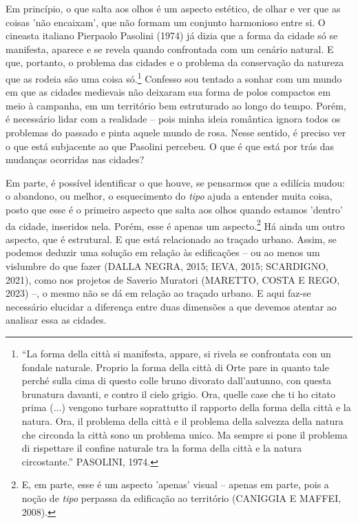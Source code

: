\documentclass[]{report}
\begin{document}
	Em princípio, o que salta aos olhos é um aspecto estético, de olhar e ver que as coisas 'não encaixam', que não formam um conjunto harmonioso entre si. O cineasta italiano Pierpaolo Pasolini (1974) já dizia que a forma da cidade só se manifesta, aparece e se revela quando confrontada com um cenário natural. E que, portanto, o problema das cidades e o problema da conservação da natureza que as rodeia são uma coisa só.\footnote[4]{“La forma della città si manifesta, appare, si rivela se confrontata con un fondale naturale. Proprio la forma della città di Orte pare in quanto tale perché sulla cima di questo colle bruno divorato dall’autunno, con questa brunatura davanti, e contro il cielo grigio. Ora, quelle case che ti ho citato prima (...) vengono turbare soprattutto il rapporto della forma della città e la natura. Ora, il problema della città e il problema della salvezza della natura che circonda la città sono un problema unico. Ma sempre si pone il problema di rispettare il confine naturale tra la forma della città e la natura circostante.” PASOLINI, 1974.} Confesso sou tentado a sonhar com um mundo em que as cidades medievais não deixaram sua forma de polos compactos em meio à campanha, em um território bem estruturado ao longo do tempo. Porém, é necessário lidar com a realidade – pois minha ideia romântica ignora todos os problemas do passado e pinta aquele mundo de rosa.  Nesse sentido, é preciso ver o que está subjacente ao que Pasolini percebeu. O que é que está por trás das mudanças ocorridas nas cidades? 
	
	Em parte, é possível identificar o que houve, se pensarmos que a edilícia mudou: o abandono, ou melhor, o esquecimento do \textit{tipo} ajuda a entender muita coisa, posto que esse é o primeiro aspecto que salta aos olhos quando estamos 'dentro' da cidade, inseridos nela. Porém, esse é apenas um aspecto.\footnote[5]{E, em parte, esse é um aspecto 'apenas' visual – apenas em parte, pois a noção de \textit{tipo} perpassa da edificação ao território (CANIGGIA E MAFFEI, 2008). } Há ainda um outro aspecto, que é estrutural. E que está relacionado ao traçado urbano. Assim, se podemos deduzir uma solução em relação às edificações – ou ao menos um vislumbre do que fazer (DALLA NEGRA, 2015; IEVA, 2015; SCARDIGNO, 2021), como nos projetos de Saverio Muratori (MARETTO, COSTA E REGO, 2023) –, o mesmo não se dá em relação ao traçado urbano. E aqui faz-se necessário elucidar a diferença entre duas dimensões a que devemos atentar ao analisar essa as cidades. 
	
\end{document}
